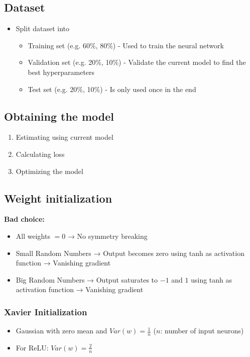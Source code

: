 \documentclass[10pt,a4paper]{article}
\begin{document}
\subsection{Dataset}
\begin{itemize}
	\item Split dataset into
	\begin{itemize}
		\item Training set (e.g. 60\%, 80\%) - Used to train the neural network
		\item Validation set (e.g. 20\%, 10\%) - Validate the current model to find the best hyperparameters
		\item Test set (e.g. 20\%, 10\%) - Is only used once in the end
	\end{itemize}
\end{itemize}

\subsection{Obtaining the model}
\begin{enumerate}
	\item Estimating using current model
	\item Calculating loss
	\item Optimizing the model
\end{enumerate}

\subsection{Weight initialization}
\textbf{Bad choice:}
\begin{itemize}
	\item All weights $= 0$ → No symmetry breaking
	\item Small Random Numbers → Output becomes zero using tanh as activation function → Vanishing gradient
	\item Big Random Numbers → Output saturates to $-1$ and $1$ using tanh as activation function → Vanishing gradient
\end{itemize}

\subsubsection{Xavier Initialization}
\begin{itemize}
	\item Gaussian with zero mean and $Var(w) = \frac 1 n$ ($n$: number of input neurons)
	\item For ReLU: $Var(w) = \frac 2 n$
\end{itemize}
\end{document}
